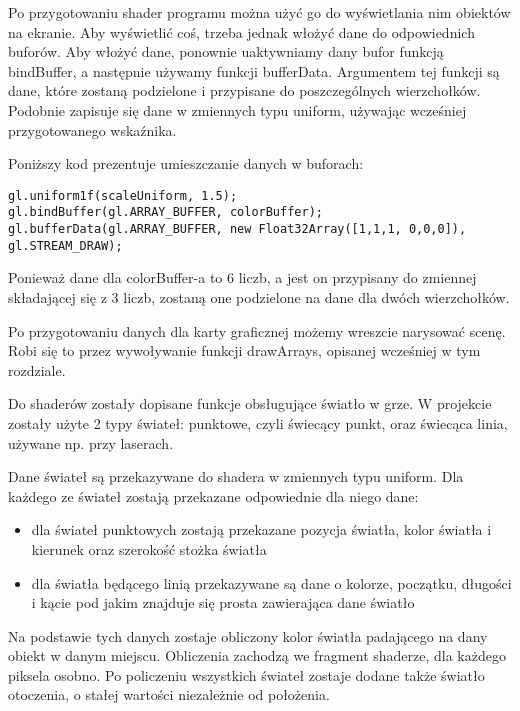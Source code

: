 Po przygotowaniu shader programu można użyć go do wy\'swietlania nim obiektów na ekranie. Aby wy\'swietlić co\'s, trzeba jednak włożyć dane do odpowiednich buforów. Aby włożyć dane, ponownie uaktywniamy dany bufor funkcją bindBuffer, a następnie używamy funkcji bufferData. Argumentem tej funkcji są dane, które zostaną podzielone i przypisane do poszczególnych wierzchołków. Podobnie zapisuje się dane w zmiennych typu uniform, używając wcze\'sniej przygotowanego wskaźnika.

Poniższy kod prezentuje umieszczanie danych w buforach:
\begin{lstlisting}
gl.uniform1f(scaleUniform, 1.5);
gl.bindBuffer(gl.ARRAY_BUFFER, colorBuffer);
gl.bufferData(gl.ARRAY_BUFFER, new Float32Array([1,1,1, 0,0,0]), gl.STREAM_DRAW);
\end{lstlisting}

Ponieważ dane dla colorBuffer-a to 6 liczb, a jest on przypisany do zmiennej składającej się z 3 liczb, zostaną one podzielone na dane dla dwóch wierzchołków.

Po przygotowaniu danych dla karty graficznej możemy wreszcie narysować scenę. Robi się to przez wywoływanie funkcji drawArrays, opisanej wcze\'sniej w tym rozdziale.\bigskip


Do shaderów zostały dopisane funkcje obsługujące \'swiatło w grze. W projekcie zostały użyte 2 typy \'swiateł: punktowe, czyli \'swiecący punkt, oraz \'swiecąca linia, używane np. przy laserach.

Dane \'swiateł są przekazywane do shadera w zmiennych typu uniform. Dla każdego ze \'swiateł zostają przekazane odpowiednie dla niego dane:\begin{itemize}[topsep=0.2em, itemsep=0.5em, partopsep=0em, parsep=0em]
	\item dla \'swiateł punktowych zostają przekazane pozycja \'swiatła, kolor \'swiatła i kierunek oraz szeroko\'sć stożka \'swiatła
	\item dla \'swiatła będącego linią przekazywane są dane o kolorze, początku, długo\'sci i kącie pod jakim znajduje się prosta zawierająca dane \'swiatło
\end{itemize}

Na podstawie tych danych zostaje obliczony kolor \'swiatła padającego na dany obiekt w danym miejscu. Obliczenia zachodzą we fragment shaderze, dla każdego piksela osobno. Po policzeniu wszystkich \'swiateł zostaje dodane także \'swiatło otoczenia, o stałej warto\'sci niezależnie od położenia.

